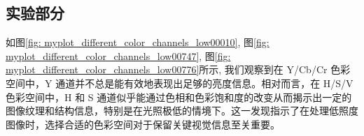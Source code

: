 \documentclass[a4paper]{ctexart}
\begin{document}
	
	\subsection*{实验部分}
	
	如图\ref{fig: myplot_different_color_channels_low00010}, 图\ref{fig: myplot_different_color_channels_low00747}, 图\ref{fig: myplot_different_color_channels_low00776}所示, 我们观察到在 Y/Cb/Cr 色彩空间中，Y 通道并不总是能有效地表现出足够的亮度信息。相对而言，在 H/S/V 色彩空间中，H 和 S 通道似乎能通过色相和色彩饱和度的改变从而揭示出一定的图像纹理和结构信息，特别是在光照极低的情境下。这一发现指示了在处理低照度图像时，选择合适的色彩空间对于保留关键视觉信息至关重要。
	
\end{document}
